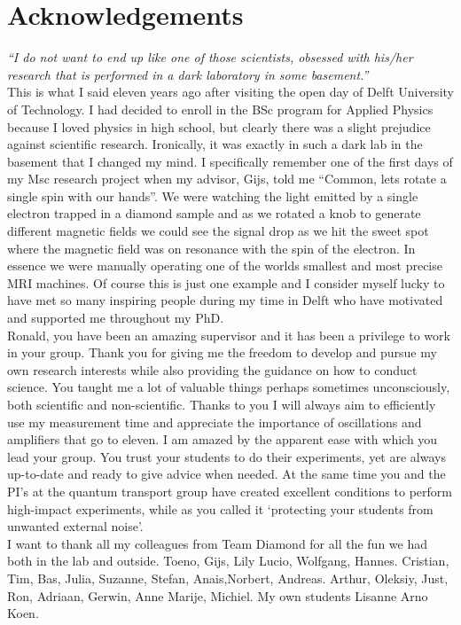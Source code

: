 %
\chapter{Acknowledgements}

\textit{``I do not want to end up like one of those scientists, obsessed with his/her research that is performed in a dark laboratory in some basement.''}
\\

This is what I said eleven years ago after visiting the open day of Delft University of Technology. I had decided to enroll in the BSc program for Applied Physics because I loved physics in high school, but clearly there was a slight prejudice against scientific research. Ironically, it was exactly in such a dark lab in the basement that I changed my mind. I specifically remember one of the first days of my Msc research project when my advisor, Gijs, told me  ``Common, lets rotate a single spin with our hands''. We were watching the light emitted by a single electron trapped in a diamond sample and as we rotated a knob to generate different magnetic fields we could see the signal drop as we hit the sweet spot where the magnetic field was on resonance with the spin of the electron. In essence we were manually operating one of the worlds smallest and most precise MRI machines.
Of course this is just one example and I consider myself lucky to have met so many inspiring people during my time in Delft who have motivated and supported me throughout my PhD.\\

Ronald, you have been an amazing supervisor and it has been a privilege to work in your group. Thank you for giving me the freedom to develop and pursue my own research interests while also providing the guidance on how to conduct science. You taught me a lot of valuable things perhaps sometimes unconsciously, both scientific and non-scientific. Thanks to you I will always aim to efficiently use my measurement time and appreciate the importance of oscillations and amplifiers that go to eleven. I am amazed by the apparent ease with which you lead your group. You trust your students to do their experiments, yet are always up-to-date and ready to give advice when needed. At the same time you and the PI's at the quantum transport group have created excellent conditions to perform high-impact experiments, while as you called it `protecting your students from unwanted external noise'. \\
\newpage
I want to thank all my colleagues from Team Diamond for all the fun we had both in the lab and outside. Toeno, Gijs, Lily Lucio, Wolfgang, Hannes. Cristian, Tim, Bas, Julia, Suzanne, Stefan, Anais,Norbert, Andreas. Arthur, Oleksiy, Just, Ron, Adriaan, Gerwin, Anne Marije, Michiel. My own students Lisanne Arno Koen. \\

